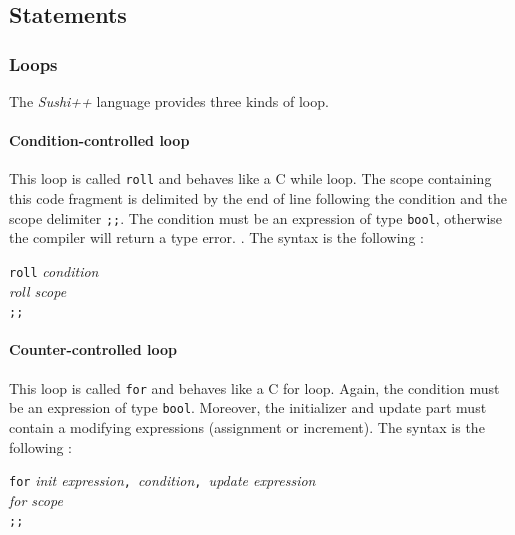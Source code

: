 \documentclass[a4paper,11pt]{article}
\begin{document}
\subsection{Statements}
\subsubsection{Loops}
The \textit{Sushi++} language provides three kinds of loop. 
\paragraph{Condition-controlled loop} This loop is called \texttt{roll} and behaves like a C while loop. The scope containing this code fragment is delimited by the end of line following the condition and the scope delimiter \texttt{;;}. The condition must be an expression of type \texttt{bool}, otherwise the compiler will return a type error. . The syntax is the following :
\begin{center}
	\begin{minipage}{0.20\linewidth}
		\texttt{roll} \textit{condition} \\
		\text{ }\text{ }\text{ }\text{ }\textit{roll scope}\\
		\texttt{;;}\\
	\end{minipage}
\end{center}
\paragraph{Counter-controlled loop} This loop is called \texttt{for} and behaves like a C for loop. Again, the condition must be an expression of type \texttt{bool}. Moreover, the initializer and update part must contain a modifying expressions (assignment or increment). The syntax is the following :
\begin{center}
	\begin{minipage}{0.50\linewidth}
		\texttt{for} \textit{init expression}\texttt{, }\textit{condition}\texttt{, }\textit{update expression} \\
		\text{ }\text{ }\text{ }\text{ }\textit{for scope}\\
		\texttt{;;}\\
	\end{minipage}
\end{center}
\end{document}
